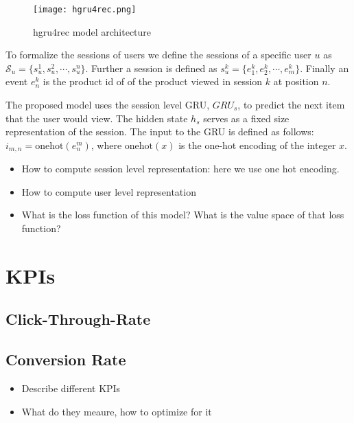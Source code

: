 \begin{figure}[ht]
	\centering
	\captionsetup{width=0.8\textwidth}
    \texttt{[image: hgru4rec.png]}
    \caption{hgru4rec model architecture}
    \label{fig:hgru4rec}
\end{figure}

To formalize the sessions of users we define the sessions of a specific user $u$ as $\mathcal{S}_u = \lbrace s_u^1, s_u^2, \cdots, s_u^n \rbrace $.
Further a session is defined as $s_u^k = \lbrace e^k_1, e^k_2, \cdots, e^k_m \rbrace $.
Finally an event $e^k_n$ is the product id of of the product viewed in session $k$ at position $n$.
\par
The proposed model uses the session level GRU, $GRU_s$, to predict the next item that the user would view.
The hidden state $h_s$ serves as a fixed size representation of the session.
The input to the GRU is defined as follows: $i_{m,n} = \text{onehot} ( e^m_n )$, where $\text{onehot}(x)$ is the one-hot encoding of the integer $x$.
\begin{itemize}
    \item How to compute session level representation: here we use one hot encoding.
    \item How to compute user level representation
    \item What is the loss function of this model? What is the value space of that loss function?
\end{itemize}

\section{KPIs}
\subsection{Click-Through-Rate}
\subsection{Conversion Rate}\label{sec:conversion_rate}
\begin{itemize}
\item Describe different KPIs
\item What do they meaure, how to optimize for it
\end{itemize}